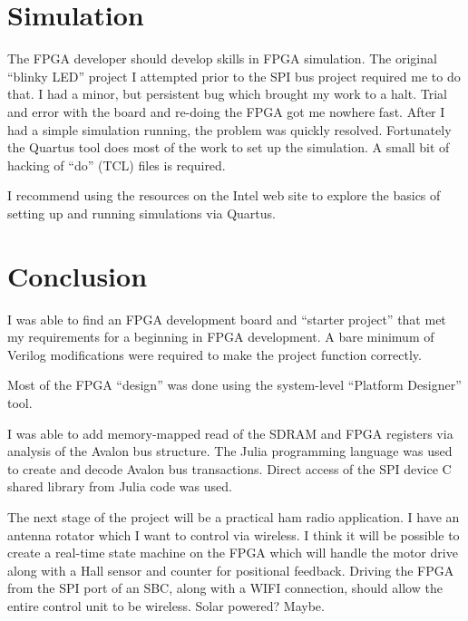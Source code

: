 \section{Simulation}

The FPGA developer should develop skills in FPGA simulation.  The original ``blinky LED'' project I attempted prior to the SPI bus project required me to do that.
I had a minor, but persistent bug which brought my work to a halt.  Trial and error with the board and re-doing the FPGA got me nowhere fast.  After I had a simple simulation running, the problem was quickly resolved.
Fortunately the Quartus tool does most of the work to set up the simulation.  A small bit of hacking of ``do'' (TCL) files is required.

I recommend using the resources on the Intel web site to explore the basics of setting up and running simulations via Quartus.

\section{Conclusion}

I was able to find an FPGA development board and ``starter project'' that met my requirements for a beginning in FPGA development.
A bare minimum of Verilog modifications were required to make the project function correctly.

Most of the FPGA ``design'' was done using the system-level ``Platform Designer'' tool.

I was able to add memory-mapped read of the SDRAM and FPGA registers via analysis of the Avalon bus structure.  The Julia programming
language was used to create and decode Avalon bus transactions.  Direct access of the SPI device C shared library from Julia code was used.

The next stage of the project will be a practical ham radio application.  I have an antenna rotator which I want to control via wireless.
I think it will be possible to create a real-time state machine on the FPGA which will handle the motor drive along with a Hall sensor
and counter for positional feedback.  Driving the FPGA from the SPI port of an SBC, along with a WIFI connection, should allow the entire
control unit to be wireless.  Solar powered?  Maybe.

